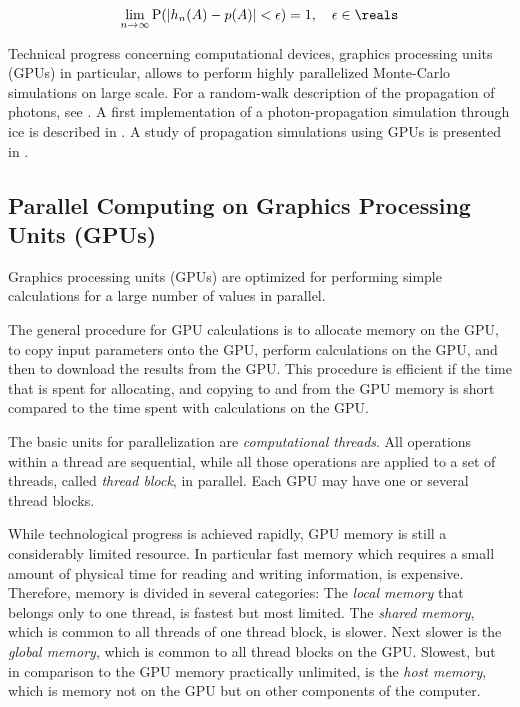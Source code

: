 $$
  \lim_{n \rightarrow \infty} \text{P}(|h_n(A) - p(A)| < \epsilon) = 1, \ \ \ \epsilon \in \reals
$$

Technical progress concerning computational devices, graphics processing units (GPUs) in particular, allows to perform highly parallelized Monte-Carlo simulations on large scale. For a random-walk description of the propagation of photons, see \cite{absorption1997}. A first implementation of a photon-propagation simulation through ice is described in \cite{lundberg}. A study of propagation simulations using GPUs is presented in \cite{ppcpaper}.


\subsection{Parallel Computing on Graphics Processing Units (GPUs)}
\label{sec:parallel_computing}

Graphics processing units (GPUs) are optimized for performing simple calculations for a large number of values in parallel.

The general procedure for GPU calculations is to allocate memory on the GPU, to copy input parameters onto the GPU, perform calculations on the GPU, and then to download the results from the GPU. This procedure is efficient if the time that is spent for allocating, and copying to and from the GPU memory is short compared to the time spent with calculations on the GPU. \cite{cudacourse}

The basic units for parallelization are \textit{computational threads}. All operations within a thread are sequential, while all those operations are applied to a set of threads, called \textit{thread block}, in parallel. Each GPU may have one or several thread blocks. \cite{cudacourse}

While technological progress is achieved rapidly, GPU memory is still a considerably limited resource. In particular fast memory which requires a small amount of physical time for reading and writing information, is expensive. Therefore, memory is divided in several categories: The \textit{local memory} that belongs only to one thread, is fastest but most limited. The \textit{shared memory}, which is common to all threads of one thread block, is slower. Next slower is the \textit{global memory}, which is common to all thread blocks on the GPU. Slowest, but in comparison to the GPU memory practically unlimited, is the \textit{host memory}, which is memory not on the GPU but on other components of the computer. \cite{cudacourse}

